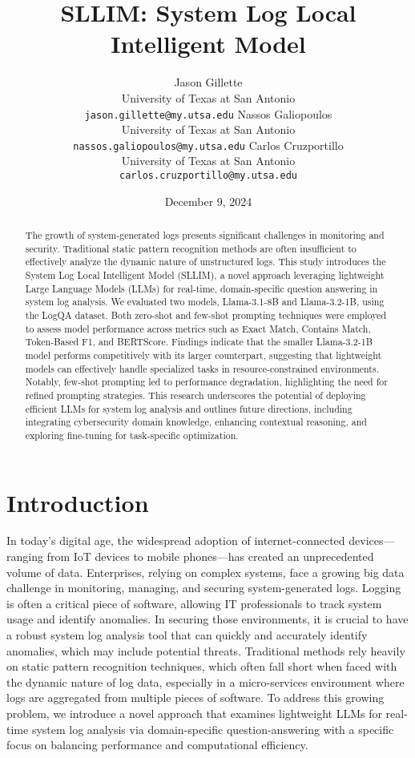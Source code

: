 \documentclass[11pt]{article}
\title{SLLIM: System Log Local Intelligent Model}
\author{
Jason Gillette \\
University of Texas at San Antonio \\
\texttt{jason.gillette@my.utsa.edu} 
\And
Nassos Galiopoulos \\
University of Texas at San Antonio \\
\texttt{nassos.galiopoulos@my.utsa.edu} 
\And
Carlos Cruzportillo \\
University of Texas at San Antonio \\
\texttt{carlos.cruzportillo@my.utsa.edu} 
}
\date{December 9, 2024}
\begin{document}
\maketitle
\begin{abstract}
The growth of system-generated logs presents significant challenges in monitoring and security. Traditional static pattern recognition methods are often insufficient to effectively analyze the dynamic nature of unstructured logs. This study introduces the System Log Local Intelligent Model (SLLIM), a novel approach leveraging lightweight Large Language Models (LLMs) for real-time, domain-specific question answering in system log analysis. We evaluated two models, Llama-3.1-8B and Llama-3.2-1B, using the LogQA dataset. Both zero-shot and few-shot prompting techniques were employed to assess model performance across metrics such as Exact Match, Contains Match, Token-Based F1, and BERTScore. Findings indicate that the smaller Llama-3.2-1B model performs competitively with its larger counterpart, suggesting that lightweight models can effectively handle specialized tasks in resource-constrained environments. Notably, few-shot prompting led to performance degradation, highlighting the need for refined prompting strategies. This research underscores the potential of deploying efficient LLMs for system log analysis and outlines future directions, including integrating cybersecurity domain knowledge, enhancing contextual reasoning, and exploring fine-tuning for task-specific optimization.
\end{abstract}

\section{Introduction}
In today’s digital age, the widespread adoption of internet-connected devices—ranging from IoT devices to mobile phones—has created an unprecedented volume of data. Enterprises, relying on complex systems, face a growing big data challenge in monitoring, managing, and securing system-generated logs. Logging is often a critical piece of software, allowing IT professionals to track system usage and identify anomalies. In securing those environments, it is crucial to have a robust system log analysis tool that can quickly and accurately identify anomalies, which may include potential threats. Traditional methods rely heavily on static pattern recognition techniques, which often fall short when faced with the dynamic nature of log data, especially in a micro-services environment where logs are aggregated from multiple pieces of software. To address this growing problem, we introduce a novel approach that examines lightweight LLMs for real-time system log analysis via domain-specific question-answering with a specific focus on balancing performance and computational efficiency.
\end{document}
